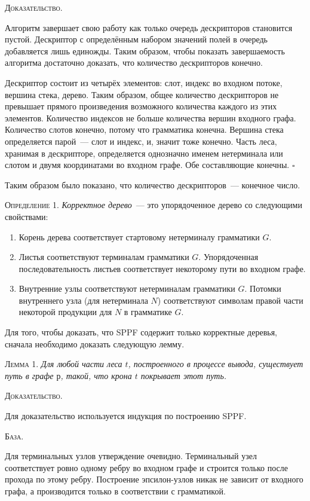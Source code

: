 \textsc{Доказательство.}

Алгоритм завершает свою работу как только очередь дескрипторов становится пустой. Дескриптор с определённым набором значений полей в очередь добавляется лишь единожды. Таким образом, чтобы показать завершаемость алгоритма достаточно доказать, что количество дескрипторов конечно. 

Дескриптор состоит из четырёх элементов: слот, индекс во входном потоке, вершина стека, дерево. Таким образом, общее количество дескрипторов не превышает прямого произведения возможного количества каждого из этих элементов. Количество индексов не больше количества вершин входного графа. Количество слотов конечно, потому что грамматика конечна. Вершина стека определяется парой~--- слот и индекс, и, значит тоже конечно. Часть леса, хранимая в дескрипторе, определяется однозначно именем нетерминала или слотом и двумя координатами во входном графе. Обе составляющие конечны. $\square$

Таким образом было показано, что количество дескрипторов~--- конечное число.

\textsc{Определение 1.} 
\emph{Корректное дерево}~--- это упорядоченное дерево со следующими свойствами:
\begin{enumerate}
  \item Корень дерева соответствует стартовому нетерминалу грамматики $G$.
  \item Листья соответствуют терминалам грамматики $G$. Упорядоченная последовательность листьев соответствует некоторому пути во входном графе.
  \item Внутренние узлы соответствуют нетерминалам грамматики $G$. Потомки внутреннего узла (для нетерминала $N$) соответствуют символам правой части некоторой продукции для $N$ в грамматике $G$.
\end{enumerate}

Для того, чтобы доказать, что SPPF содержит только корректные деревья, сначала необходимо доказать следующую лемму.

\textsc{Лемма 1.} 
\textit{Для любой части леса $t$, построенного в процессе вывода, существует путь в графе $р$, такой, что крона $t$ покрывает этот путь. }

\textsc{Доказательство.}

Для доказательство используется индукция по построению SPPF. 

\textsc{База.}

Для терминальных узлов утверждение очевидно. Терминальный узел соответствует ровно одному ребру во входном графе и строится только после прохода по этому ребру. Построение эпсилон-узлов никак не зависит от входного графа, а производится только в соответствии с грамматикой. 

